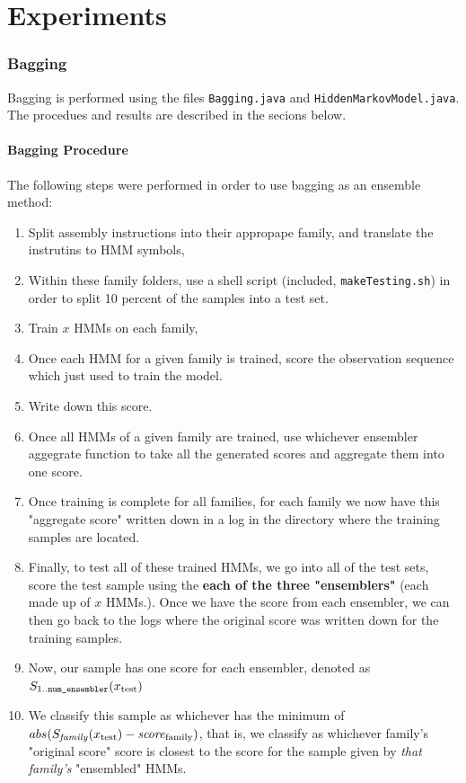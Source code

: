 \documentclass[12pt]{article}
\begin{document}
\part{Experiments}
\section{Bagging}
  Bagging is performed using the files \texttt{Bagging.java} and \texttt{HiddenMarkovModel.java}. The procedues and results are described in the secions below.
\subsection{Bagging Procedure}
  The following steps were performed in order to use bagging as an ensemble method:
  \begin{enumerate}
    \item Split assembly instructions into their appropape family, and translate the instrutins to HMM symbols,
    \item Within these family folders, use a shell script (included, \texttt{makeTesting.sh}) in order to split 10 percent of the samples into a test set.
    \item Train $x$ HMMs on each family,
    \item Once each HMM for a given family is trained, score the observation sequence which just used to train the model.
    \item Write down this score. 
    \item Once all HMMs of a given family are trained, use whichever ensembler aggegrate function to take all the generated scores and aggregate them into one score. 
    \item Once training is complete for all families, for each family we now have this "aggregate score" written down in a log in the directory where the training samples are located.
    \item Finally, to test all of these trained HMMs, we go into all of the test sets, score the test sample using the \textbf{each of the three "ensemblers"} (each made up of $x$ HMMs.). Once we have the score from each ensembler, we can then go back to the logs where the original score was written down for the training samples. 
    \item Now, our sample has one score for each ensembler, denoted as $S_{1..\text{\texttt{num\_ensembler}}}(x_{\text{test}})$
    \item We classify this sample as whichever has the minimum of $abs(S_{\text{\textit{family}}}(x_{\text{test}}) - \text{\textit{score}}_\text{family} )$, that is, we classify as whichever family's "original score" score is closest to the score for the sample given by \textit{that family's} "ensembled" HMMs.
  \end{enumerate}
\end{document}
